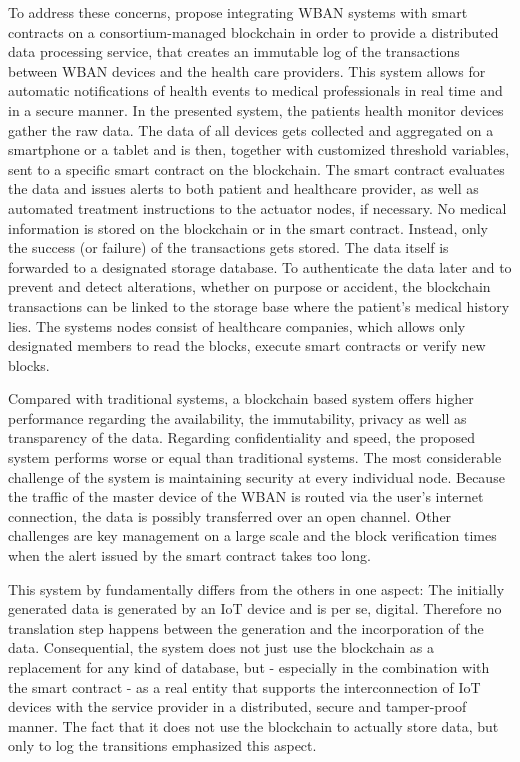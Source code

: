 To address these concerns, \citeauthor{Baccarini2018} propose integrating WBAN systems with smart contracts on a consortium-managed blockchain in order to provide a distributed data processing service, that creates an immutable log of the transactions between WBAN devices and the health care providers. \cite{Baccarini2018} This system allows for automatic notifications of health events to medical professionals in real time and in a secure manner.
In the presented system, the patients health monitor devices gather the raw data. The data of all devices gets collected and aggregated on a smartphone or a tablet and is then, together with customized threshold variables, sent to a specific smart contract on the blockchain. The smart contract evaluates the data and issues alerts to both patient and healthcare provider, as well as automated treatment instructions to the actuator nodes, if necessary.
No medical information is stored on the blockchain or in the smart contract. Instead, only the success (or failure) of the transactions gets stored. The data itself is forwarded to a designated storage database.
To authenticate the data later and to prevent and detect alterations, whether on purpose or accident, the blockchain transactions can be linked to the storage base where the patient's medical history lies.
The systems nodes consist of healthcare companies, which allows only designated members to read the blocks, execute smart contracts or verify new blocks.

Compared with traditional systems, a blockchain based system offers higher performance regarding the availability, the immutability, privacy as well as transparency of the data. Regarding confidentiality and speed, the proposed system performs worse or equal than traditional systems. \cite{Baccarini2018}
The most considerable challenge of the system is maintaining security at every individual node. Because the traffic of the master device of the WBAN is routed via the user's internet connection, the data is possibly transferred over an open channel.  Other challenges are key management on a large scale and the block verification times when the alert issued by the smart contract takes too long. \cite{Baccarini2018}

This system by \cite{Baccarini2018} fundamentally differs from the others in one aspect: The initially generated data is generated by an IoT device and is per se, digital. Therefore no translation step happens between the generation and the incorporation of the data.
Consequential, the system does not just use the blockchain as a replacement for any kind of database, but - especially in the combination with the smart contract - as a real entity that supports the interconnection of IoT devices with the service provider in a distributed, secure and tamper-proof manner. The fact that it does not use the blockchain to actually store data, but only to log the transitions emphasized this aspect.

